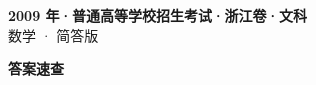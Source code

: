 \documentclass[zihao=-4, a4paper]{ctexart}
\begin{document}
\begin{center}
  {\Large\bfseries 2009 年·普通高等学校招生考试·浙江卷·文科}\\[4pt]
  {\large 数学 · 简答版}
\end{center}
\medskip
{}

\clearpage
{}
\begin{center}{\Large\bfseries 答案速查}\end{center}
\medskip

\end{document}
